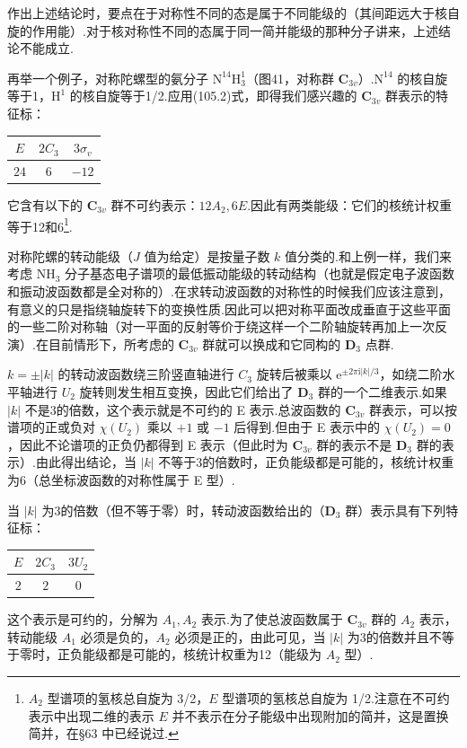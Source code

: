 作出上述结论时，要点在于对称性不同的态是属于不同能级的（其间距远大于核自旋的作用能）.对于核对称性不同的态属于同一简并能级的那种分子讲来，上述结论不能成立.

再举一个例子，对称陀螺型的氨分子 $\mathrm{N^{14}H_3^1}$（图41，对称群 $\boldsymbol{C}_{3v}$）.$\mathrm{N}^{14}$ 的核自旋等于1，$\mathrm{H}^1$ 的核自旋等于1/2.应用(105.2)式，即得我们感兴趣的 $\boldsymbol{C}_{3v}$ 群表示的特征标：
\begin{center}
\begin{tabular}{ccc}
  $E$ & $2C_3$ & $3\sigma_v$\\ \hline
  $24$ & $6$ & $-12$\\ \hline
\end{tabular}
\end{center}
它含有以下的 $\boldsymbol{C}_{3v}$ 群不可约表示：$12A_2,6E$.因此有两类能级：它们的核统计权重等于12和6\footnote{$A_2$ 型谱项的氢核总自旋为 3/2，$E$ 型谱项的氢核总自旋为 1/2.注意在不可约表示中出现二维的表示 $E$ 并不表示在分子能级中出现附加的简并，这是置换简并，在§63 中已经说过.}.

对称陀螺的转动能级（$J$ 值为给定）是按量子数 $k$ 值分类的.和上例一样，我们来考虑 $\mathrm{NH_3}$ 分子基态电子谱项的最低振动能级的转动结构（也就是假定电子波函数和振动波函数都是全对称的）.在求转动波函数的对称性的时候我们应该注意到，有意义的只是指绕轴旋转下的变换性质.因此可以把对称平面改成垂直于这些平面的一些二阶对称轴（对一平面的反射等价于绕这样一个二阶轴旋转再加上一次反演）.在目前情形下，所考虑的 $\boldsymbol{C}_{3v}$ 群就可以换成和它同构的 $\boldsymbol{D}_3$ 点群.

$k=\pm|k|$ 的转动波函数绕三阶竖直轴进行 $C_3$ 旋转后被乘以 $\mathrm{e}^{\pm2\pi\mathrm{i}|k|/3}$，如绕二阶水平轴进行 $U_2$ 旋转则发生相互变换，因此它们给出了 $\boldsymbol{D}_3$ 群的一个二维表示.如果 $|k|$ 不是3的倍数，这个表示就是不可约的 E 表示.总波函数的 $\boldsymbol{C}_{3v}$ 群表示，可以按谱项的正或负对 $\chi(U_2)$ 乘以 $+1$ 或 $-1$ 后得到.但由于 E 表示中的 $\chi(U_2)=0$，因此不论谱项的正负仍都得到 E 表示（但此时为 $\boldsymbol{C}_{3v}$ 群的表示不是 $\boldsymbol{D}_3$ 群的表示）.由此得出结论，当 $|k|$ 不等于3的倍数时，正负能级都是可能的，核统计权重为6（总坐标波函数的对称性属于 E 型）.

当 $|k|$ 为3的倍数（但不等于零）时，转动波函数给出的（$\boldsymbol{D}_3$ 群）表示具有下列特征标：
\begin{center}
\begin{tabular}{ccc}
  $E$ & $2C_3$ & $3U_2$\\ \hline
  $2$ & $2$ & $0$\\ \hline
\end{tabular}
\end{center}
这个表示是可约的，分解为 $A_1,A_2$ 表示.为了使总波函数属于 $\boldsymbol{C}_{3v}$ 群的 $A_2$ 表示，转动能级 $A_1$ 必须是负的，$A_2$ 必须是正的，由此可见，当 $|k|$ 为3的倍数并且不等于零时，正负能级都是可能的，核统计权重为12（能级为 $A_2$ 型）.

